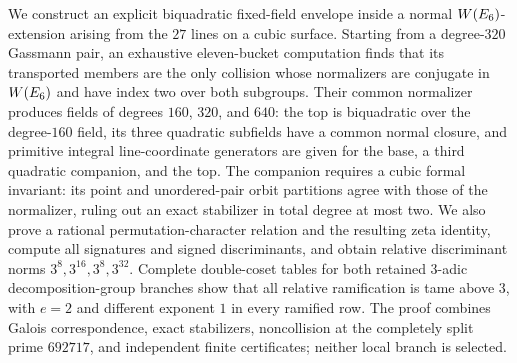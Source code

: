 We construct an explicit biquadratic fixed-field envelope inside a normal
$W(E_6)$-extension arising from the $27$ lines on a cubic surface.  Starting
from a degree-$320$ Gassmann pair, an exhaustive eleven-bucket computation
finds that its transported members are the only collision whose normalizers
are conjugate in $W(E_6)$ and have index two over both subgroups.  Their common
normalizer produces fields of degrees $160$, $320$, and $640$: the top is
biquadratic over the degree-$160$ field, its three quadratic subfields have a
common normal closure, and primitive integral line-coordinate generators are
given for the base, a third quadratic companion, and the top.  The companion
requires a cubic formal invariant: its point and unordered-pair orbit
partitions agree with those of the normalizer, ruling out an exact stabilizer
in total degree at most two.  We also prove a rational permutation-character
relation and the resulting zeta identity, compute all signatures and signed
discriminants, and obtain relative discriminant norms
$3^8,3^{16},3^8,3^{32}$.  Complete double-coset tables for both retained
$3$-adic decomposition-group branches show that all relative ramification is
tame above $3$, with $e=2$ and different exponent $1$ in every ramified row.
The proof combines Galois correspondence, exact stabilizers, noncollision at
the completely split prime $692717$, and independent finite certificates;
neither local branch is selected.
